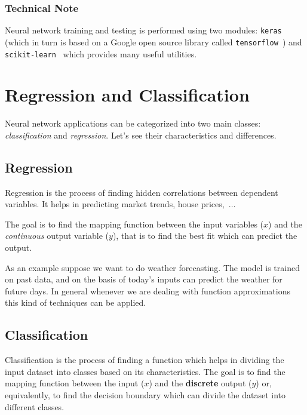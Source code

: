 \begin{attention}
\subsubsection{Technical Note}
\label{technical-note}

Neural network training and testing is performed using two modules: \texttt{keras}~\cite{bib:keras} (which in turn is based on a Google open source library called \texttt{tensorflow}~\cite{bib:tensorflow}) and \texttt{scikit-learn}~\cite{bib:scikit} which provides many useful utilities.
\end{attention}

\section{Regression and Classification}
\label{regression-and-classification}

Neural network applications can be categorized into two main classes: \emph{classification} and \emph{regression}. Let's see their characteristics and differences.

\subsection{Regression}
\label{regression}

Regression is the process of finding hidden correlations between dependent variables. It helps in predicting market trends, house prices,~$\ldots$

The goal is to find the mapping function between the input variables ($x$) and the \emph{continuous} output variable ($y$), that is to find the best fit which can predict the output.

As an example suppose we want to do weather forecasting. The model is trained on past data, and on the basis of today's inputs can predict the weather for future days. In general whenever we are dealing with function approximations this kind of techniques can be applied.

\subsection{Classification}
\label{classification}

Classification is the process of finding a function which helps in dividing the input dataset into classes based on its characteristics. The goal is to find the mapping function between the input ($x$) and the \textbf{discrete} output ($y$) or, equivalently, to find the decision boundary which can divide the dataset into different classes.

